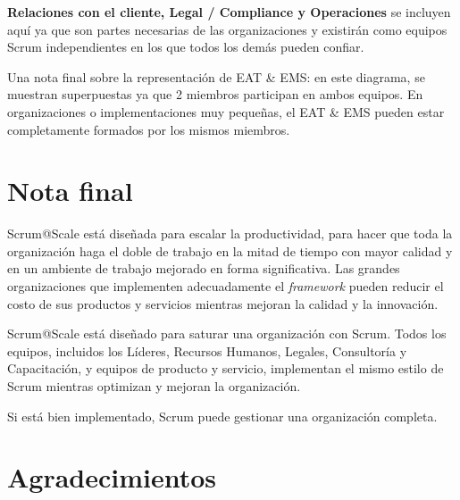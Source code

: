 \documentclass{article} %
\begin{document}
\noindent 

\noindent \textbf{Relaciones con el cliente, Legal / Compliance y  Operaciones} se incluyen aqu\'{i} ya que son partes necesarias de las organizaciones y existir\'{a}n como equipos Scrum independientes en los que todos los dem\'{a}s pueden confiar.

\noindent Una nota final sobre la representaci\'{o}n de EAT \& EMS: en este diagrama, se muestran superpuestas ya que 2 miembros participan en ambos equipos. En organizaciones o implementaciones muy peque\~{n}as, el EAT \& EMS pueden estar completamente formados por los mismos miembros.

\noindent 
\section{Nota final}

\noindent 

\noindent Scrum@Scale est\'{a} dise\~{n}ada para escalar la productividad, para hacer que toda la organizaci\'{o}n haga el doble de trabajo en la mitad de tiempo con mayor calidad y en un ambiente de trabajo mejorado en forma significativa. Las grandes organizaciones que implementen adecuadamente el \textit{framework }pueden reducir el costo de sus productos y servicios mientras mejoran la calidad y la innovaci\'{o}n.

\noindent 

\noindent Scrum@Scale est\'{a} dise\~{n}ado para saturar una organizaci\'{o}n con Scrum. Todos los equipos, incluidos los L\'{i}deres, Recursos Humanos, Legales, Consultor\'{i}a y Capacitaci\'{o}n, y equipos de producto y servicio, implementan el mismo estilo de Scrum mientras optimizan y mejoran la organizaci\'{o}n.

\noindent 

\noindent Si est\'{a} bien implementado, Scrum puede gestionar una organizaci\'{o}n completa.

\noindent 
\section{Agradecimientos}

\noindent 
\end{document}
